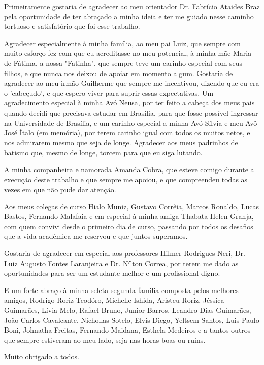 \begin{agradecimentos}

Primeiramente gostaria de agradecer ao meu orientador Dr. Fabrício Ataides Braz pela oportunidade de ter abraçado a minha ideia e ter me guiado nesse caminho tortuoso e satisfatório que foi esse trabalho.

Agradecer especialmente à minha família, ao meu pai Luiz, que sempre com muito esforço fez com que eu acreditasse no meu potencial, à minha mãe Maria de Fátima, a nossa "Fatinha", que sempre teve um carinho especial com seus filhos, e que nunca nos deixou de apoiar em momento algum. Gostaria de agradecer ao meu irmão Guilherme que sempre me incentivou, dizendo que eu era o 'cabeçudo', e que espero viver para suprir essas expectativas. Um agradecimento especial à minha Avó Neusa, por ter feito a cabeça dos meus pais quando decidi que precisava estudar em Brasília, para que fosse possível ingressar na Universidade de Brasília, e um carinho especial a minha Avó Sílvia e meu Avô José Ítalo (em memória), por terem carinho igual com todos os muitos netos, e nos admirarem mesmo que seja de longe. Agradecer aos meus padrinhos de batismo que, mesmo de longe, torcem para que eu siga lutando.

A minha companheira e namorada Amanda Cobra, que esteve comigo durante a execução deste trabalho e que sempre me apoiou, e que compreendeu todas as vezes em que não pude dar atenção.

Aos meus colegas de curso Hialo Muniz, Gustavo Corrêia, Marcos Ronaldo, Lucas Bastos, Fernando Malafaia e em especial à minha amiga Thabata Helen Granja, com quem convivi desde o primeiro dia de curso, passando por todos os desafios que a vida acadêmica me reservou e que juntos superamos.

Gostaria de agradecer em especial aos professores Hilmer Rodrigues Neri, Dr. Luiz Augusto Fontes Laranjeira e Dr. Nílton Correa, por terem me dado as oportunidades para ser um estudante melhor e um profissional digno.

E um forte abraço à minha seleta segunda familia composta pelos melhores amigos, Rodrigo Roriz Teodóro, Michelle Ishida, Aristeu Roriz, Jéssica Guimarães, Lívia Melo, Rafael Bruno, Junior Barros, Leandro Dias Guimarães, João Carlos Cavalcante, Nichollas Sotelo, Elvis Diego, Yeltsem Santos, Luis Paulo Boni, Johnatha Freitas, Fernando Maidana, Esthela Medeiros e a tantos outros que sempre estiveram ao meu lado, seja nas horas boas ou ruins.

\begin{minipage}[t]{15cm}
\flushright
Muito obrigado a todos.
\end{minipage}

\end{agradecimentos}
